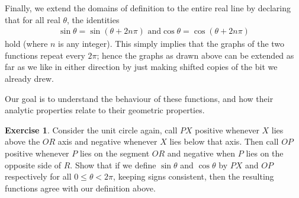 \documentclass[a4paper,leqno]{article}
\numberwithin{equation}{section}
\theoremstyle{definition}
\newtheorem{exercise}[equation]{Exercise}
\theoremstyle{remark}
\begin{document}
Finally, we extend the domains of definition to the entire real line by declaring that for all real $ \theta $, the identities
\begin{gather}
  \sin \theta = \sin (\theta + 2n\pi)\text{ and}
  \cos \theta = \cos (\theta + 2n\pi)
\end{gather}
hold (where $ n $ is any integer). This simply implies that the graphs of the two functions repeat every $ 2\pi $; hence the graphs
as drawn above can be extended as far as we like in either direction by just making shifted copies of the bit we already drew.
\begin{center}
\end{center}

Our goal is to understand the behaviour of these functions, and how their analytic properties relate to
their geometric properties.

\begin{exercise}\label{ex:geomdefn}
  Consider the unit circle again, call $ PX $ positive whenever $ X $ lies above the $ OR $ axis and negative whenever $ X $ lies below that
  axis. Then call $ OP $ positive whenever $ P $ lies on the segment $ OR $ and negative when $ P $ lies on the opposite side of $ R $. Show
  that if we define $ \sin \theta $ and $ \cos \theta $ by $ PX $ and $ OP $ respectively for all $ 0 \leq \theta < 2\pi $, keeping signs
  consistent, then the resulting functions agree with our definition above.
\end{exercise}
\end{document}
